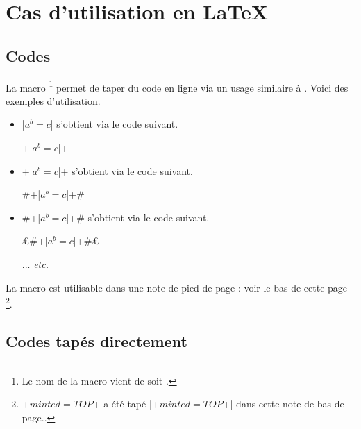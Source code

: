 \documentclass[10pt, a4paper]{article}
\begin{document}
\section{Cas d'utilisation en \LaTeX}

\subsection{Codes } \label{tdoc-listing-inline}

La macro 
\footnote{
	Le nom de la macro  vient de  soit .
}
permet de taper du code en ligne via un usage similaire à .
Voici des exemples d'utilisation.
\begin{itemize}
    \item \tdocinlatex|$a^b = c$| s'obtient via le code suivant.
		  \begin{center}
		  		\tdocinlatex+\tdocinlatex|$a^b = c$|+
		  \end{center}


    \item \tdocinlatex+\tdocinlatex|$a^b = c$|+ s'obtient via le code suivant.
		  \begin{center}
		  		\tdocinlatex#\tdocinlatex+\tdocinlatex|$a^b = c$|+#
		  \end{center}


    \item \tdocinlatex#\tdocinlatex+\tdocinlatex|$a^b = c$|+# s'obtient via le code suivant.
		  \begin{center}
		  		\tdocinlatex£\tdocinlatex#\tdocinlatex+\tdocinlatex|$a^b = c$|+#£

				\medskip

				... \emph{etc.}
		  \end{center}
\end{itemize}


\begin{tdocnote}
    La macro  est utilisable dans une note de pied de page : voir le bas de cette page
    \footnote{
        \tdocinlatex+$minted = TOP$+ a été tapé \tdocinlatex|\tdocinlatex+$minted = TOP$+| dans cette note de bas de page..
    }.
\end{tdocnote}




\subsection{Codes tapés directement}
\end{document}
